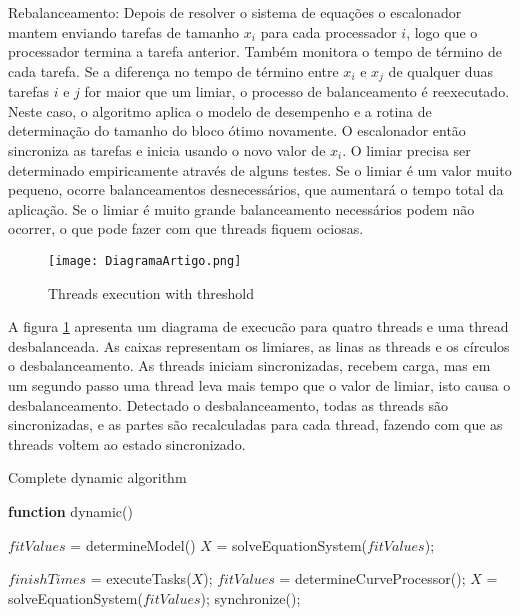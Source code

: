 Rebalanceamento: Depois de resolver o sistema de equações o escalonador mantem enviando tarefas de tamanho $x_i$ para cada processador $i$, logo que o processador termina a tarefa anterior. Também monitora o tempo de término de cada tarefa. Se a diferença no tempo de término entre $x_i$ e $x_j$ de qualquer duas tarefas $i$ e $j$ for maior que um limiar, o processo de balanceamento é reexecutado. Neste caso, o algoritmo aplica o modelo de desempenho e a rotina de determinação do tamanho do bloco ótimo novamente. O escalonador então sincroniza as tarefas e inicia usando o novo valor de $x_i$. O limiar precisa ser determinado empiricamente através de alguns testes. Se o limiar é um valor muito pequeno, ocorre balanceamentos desnecessários, que aumentará o tempo total da aplicação. Se o limiar é muito grande balanceamento necessários podem não ocorrer, o que pode fazer com que threads fiquem ociosas.

\begin{figure}[!t]
	\centering
			\texttt{[image: DiagramaArtigo.png]}
	\caption{Threads execution with threshold}
	\label{fig:Diagrama}
\end{figure}

A figura \ref{fig:Diagrama} apresenta um diagrama de execucão para quatro threads e uma thread desbalanceada. As caixas representam os limiares, as linas as threads e os círculos o desbalanceamento. As threads iniciam sincronizadas, recebem carga, mas em um segundo passo uma thread leva mais tempo que o valor de limiar, isto causa o desbalanceamento. Detectado o desbalanceamento, todas as threads são sincronizadas, e as partes são recalculadas para cada thread, fazendo com que as threads voltem ao estado sincronizado.



\begin{algorithm}

\caption{Complete dynamic algorithm}
\label{alg1}

\begin{algorithmic}		

\STATE \textbf{function} dynamic()

\STATE $fitValues$ = determineModel()
\STATE $X$ = solveEquationSystem($fitValues$);


	\STATE $finishTimes$ = executeTasks($X$);
		\STATE $fitValues$ = determineCurveProcessor();
                \STATE $X$ = solveEquationSystem($fitValues$);
                \STATE synchronize();
    	\ENDIF
\ENDWHILE

\end{algorithmic}
\end{algorithm}

